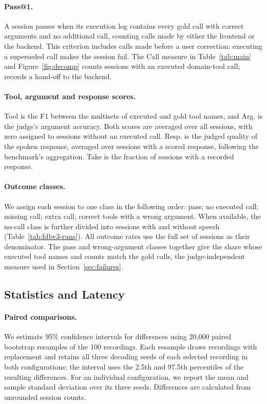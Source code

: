 \paragraph{Pass@1.}
A session passes when its execution log contains every gold call with correct arguments and no additional call, counting calls made by either the frontend or the backend.
This criterion includes calls made before a user correction: executing a superseded call makes the session fail.
The Call measure in Table~\ref{tab:main} and Figure~\ref{fig:decomp} counts sessions with an executed domain-tool call;  records a hand-off to the backend.

\paragraph{Tool, argument and response scores.}
Tool is the F1 between the multisets of executed and gold tool names, and Arg. is the judge's argument accuracy.
Both scores are averaged over all sessions, with zero assigned to sessions without an executed call.
Resp. is the judged quality of the spoken response, averaged over sessions with a scored response, following the benchmark's aggregation.
Take is the fraction of sessions with a recorded response.

\paragraph{Outcome classes.}
We assign each session to one class in the following order: pass; no executed call; missing call; extra call; correct tools with a wrong argument.
When available, the no-call class is further divided into sessions with and without speech (Table~\ref{tab:fdbv3-runs}).
All outcome rates use the full set of sessions as their denominator.
The pass and wrong-argument classes together give the share whose executed tool names and counts match the gold calls, the judge-independent measure used in Section~\ref{sec:failures}.

\subsection{Statistics and Latency}
\paragraph{Paired comparisons.}
We estimate 95\% confidence intervals for differences using 20,000 paired bootstrap resamples of the 100 recordings.
Each resample draws recordings with replacement and retains all three decoding seeds of each selected recording in both configurations; the interval uses the 2.5th and 97.5th percentiles of the resulting differences.
For an individual configuration, we report the mean and sample standard deviation over its three seeds.
Differences are calculated from unrounded session counts.

